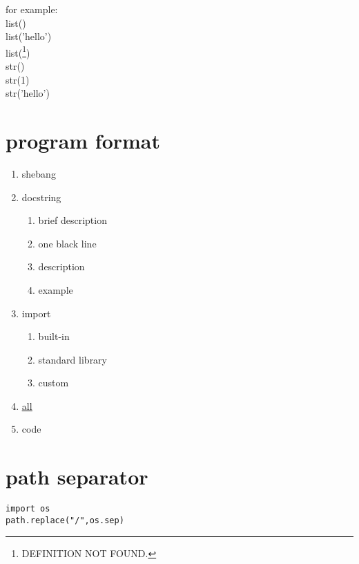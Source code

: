 \documentclass[11pt]{article}
\begin{document}
for example: \\
list() \\
list('hello') \\
list(\footnote{DEFINITION NOT FOUND.}) \\

str() \\
str(1) \\
str('hello') \\

\section{program format}
\label{sec-12}
\begin{enumerate}
\item shebang \\
\item docstring \\
\begin{enumerate}
\item brief description \\
\item one black line \\
\item description \\
\item example \\
\end{enumerate}
\item import \\
\begin{enumerate}
\item built-in \\
\item standard library \\
\item custom \\
\end{enumerate}
\item \uline{\uline{all}} \\
\item code \\
\end{enumerate}


\section{path separator}
\label{sec-13}
\begin{verbatim}
import os
path.replace("/",os.sep)
\end{verbatim}
\end{document}
